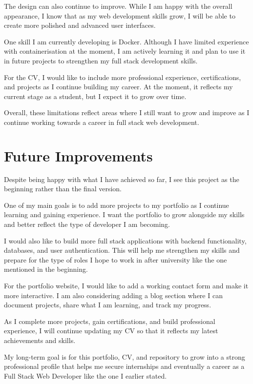 \documentclass[12pt,a4paper]{article}
\begin{document}
The design can also continue to improve. While I am happy with the overall appearance, I know that as my web development skills grow, I will be able to create more polished and advanced user interfaces.

One skill I am currently developing is Docker. Although I have limited experience with containerisation at the moment, I am actively learning it and plan to use it in future projects to strengthen my full stack development skills.


For the CV, I would like to include more professional experience, certifications, and projects as I continue building my career. At the moment, it reflects my current stage as a student, but I expect it to grow over time.

Overall, these limitations reflect areas where I still want to grow and improve as I continue working towards a career in full stack web development.

\section{Future Improvements}

Despite being happy with what I have achieved so far, I see this project as the beginning rather than the final version.

One of my main goals is to add more projects to my portfolio as I continue learning and gaining experience. I want the portfolio to grow alongside my skills and better reflect the type of developer I am becoming.

I would also like to build more full stack applications with backend functionality, databases, and user authentication. This will help me strengthen my skills and prepare for the type of roles I hope to work in after university like the one mentioned in the beginning.

For the portfolio website, I would like to add a working contact form and make it more interactive. I am also considering adding a blog section where I can document projects, share what I am learning, and track my progress.

As I complete more projects, gain certifications, and build professional experience, I will continue updating my CV so that it reflects my latest achievements and skills.

My long-term goal is for this portfolio, CV, and repository to grow into a strong professional profile that helps me secure internships and eventually a career as a Full Stack Web Developer like the one I earlier stated.
\end{document}
